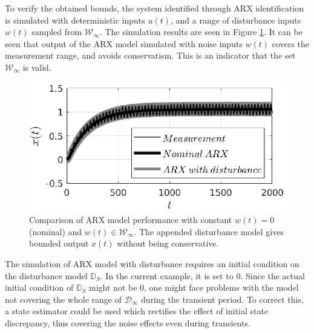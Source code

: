 \documentclass[letterpaper, 10 pt, conference]{ieeeconf}  %
\begin{document}
	To verify the obtained bounds, the system identified through ARX identification is simulated with deterministic inputs $u(t)$, and a range of disturbance inputs $w(t)$ sampled from $\mathcal{W}_{\infty}$. The simulation results are seen in Figure \ref{simulation}. It can be seen that output of the ARX model simulated with noise inputs $w(t)$ covers the measurement range, and avoids conservatism. This is an indicator that the set $\mathcal{W}_{\infty}$ is valid.
	\begin{figure}[h]
		\hspace{22pt}
		\includegraphics[scale = 0.70]{simulation.eps}
		\caption{Comparison of ARX model performance with constant $w(t)=0$(nominal) and $w(t)\in \mathcal{W}_{\infty}$. The appended disturbance model gives bounded output $x(t)$ without being conservative.}
		\label{simulation}
	\end{figure} 
	The simulation of ARX model with disturbance requires an initial condition on the disturbance model $\mathbb{D}_S$. In the current example, it is set to $0$. Since the actual initial condition of $\mathbb{D}_S$ might not be $0$, one might face problems with the model not covering the whole range of $\mathcal{D}_{\infty}$ during the transient period. To correct this, a state estimator could be used which rectifies the effect of initial state discrepancy, thus covering the noise effects even during transients.
	\fi
\end{document}
